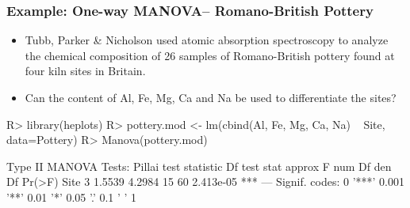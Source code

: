 \begin{frame}[containsverbatim]
	\frametitle{Example: One-way MANOVA-- Romano-British Pottery}

  \begin{itemize}
  	\item Tubb, Parker \& Nicholson used atomic absorption spectroscopy
	to analyze the chemical composition of 26 samples of Romano-British
	pottery found at four kiln sites in Britain.
	
	\item Can the content of Al, Fe, Mg, Ca and Na be used to 
	differentiate the sites?
  \end{itemize}

\begin{CodeInput}
R> library(heplots)
R> pottery.mod <- lm(cbind(Al, Fe, Mg, Ca, Na) ~ Site, 
                     data=Pottery)
R> Manova(pottery.mod)
\end{CodeInput}
\begin{CodeOutput}
Type II MANOVA Tests: Pillai test statistic
     Df test stat approx F num Df den Df    Pr(>F)    
Site  3    1.5539   4.2984     15     60 2.413e-05 ***
---
Signif. codes:  0 '***' 0.001 '**' 0.01 '*' 0.05 '.' 0.1 ' ' 1 
\end{CodeOutput} 
\end{frame}

